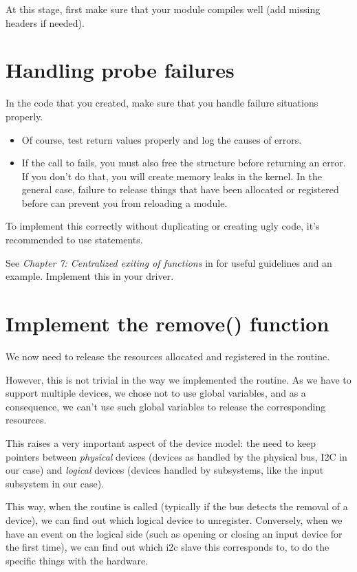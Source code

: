 At this stage, first make sure that your module compiles well (add
missing headers if needed).

\section{Handling probe failures}

In the code that you created, make sure that you handle failure
situations properly.

\begin{itemize}
\item Of course, test return values properly and log 
      the causes of errors.
\item If the call to  fails,
      you must also free the  structure
      before returning an error. If you don't do that, you will create
      memory leaks in the kernel. In the general case, failure to
      release things that have been allocated or registered before
      can prevent you from reloading a module.
\end{itemize}

To implement this correctly without duplicating or creating ugly code,
it's recommended to use  statements.

See {\em Chapter 7: Centralized exiting of functions} in
 for useful guidelines and an example.
Implement this in your driver. 

\section{Implement the remove() function}

We now need to release the resources allocated and registered in the
 routine.

However, this is not trivial in the way we implemented the
 routine. As we have to support multiple devices, we chose
not to use global variables, and as a consequence, we can't use such
global variables to release the corresponding resources. 

This raises a very important aspect of the device model: the need to
keep pointers between {\em physical} devices (devices as handled by the
physical bus, I2C in our case) and {\em logical} devices (devices handled by subsystems,
like the input subsystem in our case).

This way, when the  routine is called (typically if the
bus detects the removal of a device), we can find out which logical
device to unregister. Conversely, when we have an event on the logical
side (such as opening or closing an input device for the first time),
we can find out which i2c slave this corresponds to, to do the specific
things with the hardware.  

